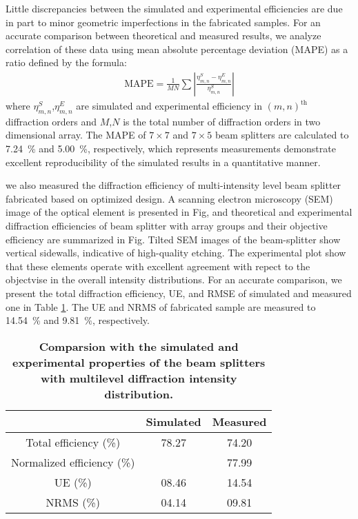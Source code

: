 Little discrepancies between the simulated and experimental efficiencies are due in part to minor geometric imperfections in the fabricated samples.
For an accurate comparison between theoretical and measured results, we analyze correlation of these data using mean absolute percentage deviation (MAPE) as a ratio defined by the formula:
\begin{align}\label{eq:correlation}
\mathrm{MAPE} =\frac{1}{MN} \sum \left|\frac{\eta_{m,n}^{S}-\eta_{m,n}^{E}}{\eta_{m,n}^{S}}\right|
\end{align}
where $\eta_{m,n}^{S}$,$\eta_{m,n}^{E}$ are simulated and experimental efficiency in $(m,n)^\text{th}$ diffraction orders and $M$,$N$ is the total number of diffraction orders in two dimensional array.
The MAPE of $7\times7$ and $7\times5$ beam splitters are calculated to \SI{7.24}{\percent} and \SI{5.00}{\percent}, respectively, which represents measurements demonstrate excellent reproducibility of the simulated results in a quantitative manner.

we also measured the diffraction efficiency of multi-intensity level beam splitter fabricated based on optimized design. 
A scanning electron microscopy (SEM) image of the optical element is presented in Fig, and theoretical and experimental diffraction efficiencies of beam splitter with array groups and their objective efficiency are summarized in Fig.
Tilted SEM images of the beam-splitter show vertical sidewalls, indicative of high-quality etching.
The experimental plot show that these elements operate with excellent agreement with repect to the objectvise in the overall intensity distributions.
For an accurate comparison, we present the total diffraction efficiency, UE, and RMSE of simulated and measured one in Table \ref{tab:results_multilevel}.
The UE and NRMS of fabricated sample are measured to \SI{14.54}{\percent} and \SI{9.81}{\percent}, respectively.
\begin{table}[htbp]
\centering
\caption{\bf Comparsion with the simulated and experimental properties of the beam splitters with multilevel diffraction intensity distribution.}
\begin{tabular}{ccc}
\hline
 & Simulated & Measured  \\
\hline
Total efficiency (\%) & 78.27 & 74.20 \\
Normalized efficiency (\%) & {} & 77.99\\
UE (\%) & 08.46 & 14.54\\
NRMS (\%) & 04.14 & 09.81\\
\hline
\end{tabular}
  \label{tab:results_multilevel}
\end{table}

